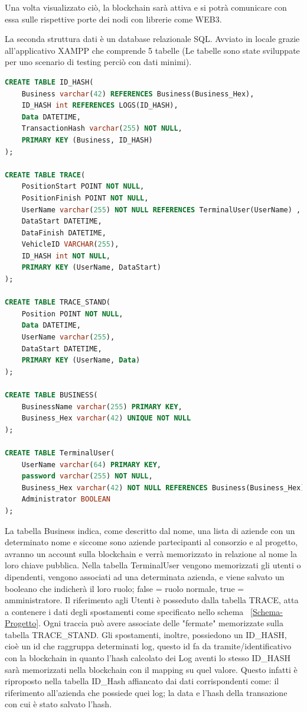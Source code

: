 \documentclass[11pt,a4paper,titlepage]{report}
\begin{document}
Una volta visualizzato ciò, la blockchain sarà attiva e si potrà comunicare con essa sulle rispettive porte dei nodi con librerie come WEB3.

La seconda struttura dati è un database relazionale SQL. Avviato in locale grazie all'applicativo XAMPP che comprende 5 tabelle (Le tabelle sono state sviluppate per uno scenario di testing perciò con dati minimi).
\begin{lstlisting}[language=SQL]
CREATE TABLE ID_HASH(
	Business varchar(42) REFERENCES Business(Business_Hex),
	ID_HASH int REFERENCES LOGS(ID_HASH),
	Data DATETIME,
	TransactionHash varchar(255) NOT NULL,
	PRIMARY KEY (Business, ID_HASH)
);

CREATE TABLE TRACE(
	PositionStart POINT NOT NULL,
	PositionFinish POINT NOT NULL,
	UserName varchar(255) NOT NULL REFERENCES TerminalUser(UserName) ,
	DataStart DATETIME,
	DataFinish DATETIME,
	VehicleID VARCHAR(255),
	ID_HASH int NOT NULL,
	PRIMARY KEY (UserName, DataStart)
);

CREATE TABLE TRACE_STAND(
	Position POINT NOT NULL,
	Data DATETIME,
	UserName varchar(255),
	DataStart DATETIME,
	PRIMARY KEY (UserName, Data)
);

CREATE TABLE BUSINESS(
	BusinessName varchar(255) PRIMARY KEY,
	Business_Hex varchar(42) UNIQUE NOT NULL
);

CREATE TABLE TerminalUser(
	UserName varchar(64) PRIMARY KEY,
	password varchar(255) NOT NULL,
	Business_Hex varchar(42) NOT NULL REFERENCES Business(Business_Hex),
	Administrator BOOLEAN
);
\end{lstlisting}

La tabella Business indica, come descritto dal nome, una lista di aziende con un determinato nome e siccome sono aziende partecipanti al consorzio e al progetto, avranno un account sulla blockchain e verrà memorizzato in relazione al nome la loro chiave pubblica. Nella tabella TerminalUser vengono memorizzati gli utenti o dipendenti, vengono associati ad una determinata azienda, e viene salvato un booleano che indicherà il loro ruolo; false = ruolo normale, true = amministratore. Il riferimento agli Utenti è posseduto dalla tabella TRACE, atta a contenere i dati degli spostamenti come specificato nello schema ~\ref{Schema-Progetto}. Ogni traccia può avere associate delle "fermate" memorizzate sulla tabella TRACE\_STAND. Gli spostamenti, inoltre, possiedono un ID\_HASH, cioè un id che raggruppa determinati log, questo id fa da tramite/identificativo con la blockchain in quanto l'hash calcolato dei Log aventi lo stesso ID\_HASH sarà memorizzati nella blockchain con il mapping su quel valore. Questo infatti è riproposto nella tabella ID\_Hash affiancato dai dati corrispondenti come: il riferimento all'azienda che possiede quei log; la data e l'hash della transazione con cui è stato salvato l'hash.
\end{document}
